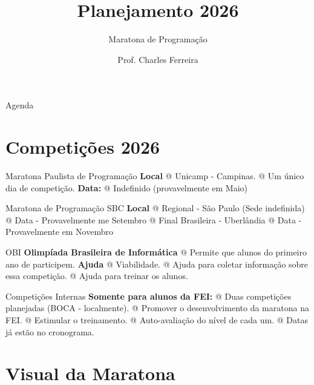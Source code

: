 \documentclass{FEIbeamer}
\author[e-mail: cferreira@fei.edu.br]{Prof. Charles Ferreira}
\title{Planejamento 2026}
\subtitle{Maratona de Programação}
\begin{document}
\begin{frame}{Agenda}
    \tableofcontents
\end{frame}

\section{Competições 2026}

\begin{frame}[fragile]{Maratona Paulista de Programação}
    \textbf{Local}
    \bi%
    @ Unicamp - Campinas.
    @ Um único dia de competição.
    \ei%
    \textbf{Data:}
    \bi%
    @ Indefinido (provavelmente em Maio)\pause
    \ei%
\end{frame}


\begin{frame}[fragile]{Maratona de Programação SBC}
    \textbf{Local}
    \bi%
    @ Regional - São Paulo (Sede indefinida)
    @ Data - Provavelmente me Setembro
    @ Final Brasileira - Uberlândia
    @ Data - Provavelmente em Novembro\pause
    \ei%
\end{frame}

\begin{frame}[fragile]{OBI}
    \textbf{Olimpíada Brasileira de Informática}
    \bi%
    @ Permite que alunos do primeiro ano de  participem.\pause
    \ei%
    \textbf{Ajuda}\pause
    \bi%
    @ Viabilidade.\pause
    @ Ajuda para coletar informação sobre essa competição.\pause
    @ Ajuda para treinar os alunos.
    \ei%

\end{frame}

\begin{frame}[fragile]{Competições Internas}
    \textbf{Somente para alunos da FEI:}\pause
    \bi%
    @ Duas competições planejadas (BOCA - localmente).\pause
    @ Promover o desenvolvimento da maratona na FEI.\pause
    @ Estimular o treinamento.\pause
    @ Auto-avaliação do nível de cada um.\pause
    @ Datas já estão no cronograma.
    \ei%
\end{frame}


\section{Visual da Maratona}
\end{document}
